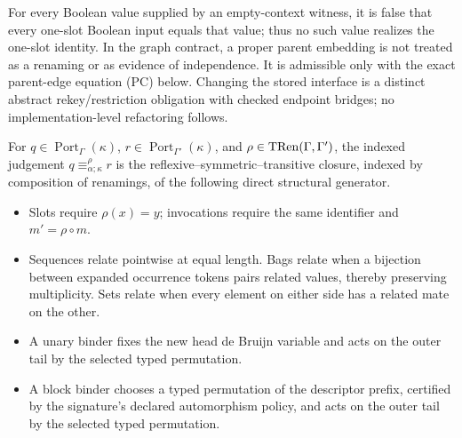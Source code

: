 For every Boolean value supplied by an empty-context witness, it is false that
every one-slot Boolean input equals that value; thus no such value realizes the one-slot identity.
In the graph contract, a proper parent embedding is not treated as a renaming or as evidence of independence.
It is admissible only with the exact parent-edge equation (PC) below.  Changing the stored interface is a
distinct abstract rekey/restriction obligation with checked endpoint bridges; no implementation-level refactoring follows.

\begin{definition}
\label{def:alpha-port}
For $q\in\operatorname{Port}_{\Gamma}(\kappa)$,
$r\in\operatorname{Port}_{\Gamma'}(\kappa)$, and
$\rho\in\operatorname{TRen}(\Gamma,\Gamma')$, the indexed judgement
$q\equiv_{\alpha;\kappa}^{\rho}r$ is the reflexive--symmetric--transitive
closure, indexed by composition of renamings, of the following direct
structural generator.
\begin{itemize}
\item Slots require $\rho(x)=y$; invocations require the same identifier and
$m'=\rho\circ m$.
\item Sequences relate pointwise at equal length.  Bags relate when a
bijection between expanded occurrence tokens pairs related values, thereby
preserving multiplicity.  Sets relate when every element on either
side has a related mate on the other.
\item A unary binder fixes the new head de Bruijn variable and acts on the
outer tail by the selected typed permutation.
\item A block binder chooses a typed permutation of the descriptor prefix,
certified by the signature's declared automorphism policy, and acts on the
outer tail by the selected typed permutation.
\end{itemize}
\end{definition}

